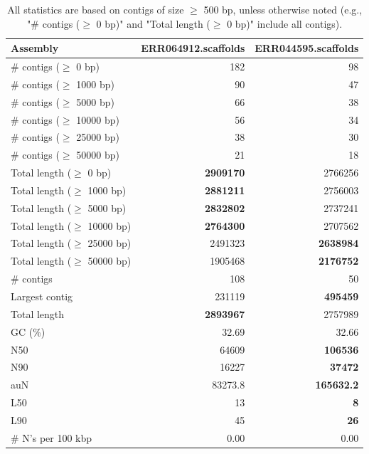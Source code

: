 \documentclass[12pt,a4paper]{article}
\begin{document}
\begin{table}[ht]
\begin{center}
\caption{All statistics are based on contigs of size $\geq$ 500 bp, unless otherwise noted (e.g., "\# contigs ($\geq$ 0 bp)" and "Total length ($\geq$ 0 bp)" include all contigs).}
\begin{tabular}{|l*{2}{|r}|}
\hline
Assembly & ERR064912.scaffolds & ERR044595.scaffolds \\ \hline
\# contigs ($\geq$ 0 bp) & 182 & 98 \\ \hline
\# contigs ($\geq$ 1000 bp) & 90 & 47 \\ \hline
\# contigs ($\geq$ 5000 bp) & 66 & 38 \\ \hline
\# contigs ($\geq$ 10000 bp) & 56 & 34 \\ \hline
\# contigs ($\geq$ 25000 bp) & 38 & 30 \\ \hline
\# contigs ($\geq$ 50000 bp) & 21 & 18 \\ \hline
Total length ($\geq$ 0 bp) & {\bf 2909170} & 2766256 \\ \hline
Total length ($\geq$ 1000 bp) & {\bf 2881211} & 2756003 \\ \hline
Total length ($\geq$ 5000 bp) & {\bf 2832802} & 2737241 \\ \hline
Total length ($\geq$ 10000 bp) & {\bf 2764300} & 2707562 \\ \hline
Total length ($\geq$ 25000 bp) & 2491323 & {\bf 2638984} \\ \hline
Total length ($\geq$ 50000 bp) & 1905468 & {\bf 2176752} \\ \hline
\# contigs & 108 & 50 \\ \hline
Largest contig & 231119 & {\bf 495459} \\ \hline
Total length & {\bf 2893967} & 2757989 \\ \hline
GC (\%) & 32.69 & 32.66 \\ \hline
N50 & 64609 & {\bf 106536} \\ \hline
N90 & 16227 & {\bf 37472} \\ \hline
auN & 83273.8 & {\bf 165632.2} \\ \hline
L50 & 13 & {\bf 8} \\ \hline
L90 & 45 & {\bf 26} \\ \hline
\# N's per 100 kbp & 0.00 & 0.00 \\ \hline
\end{tabular}
\end{center}
\end{table}
\end{document}
